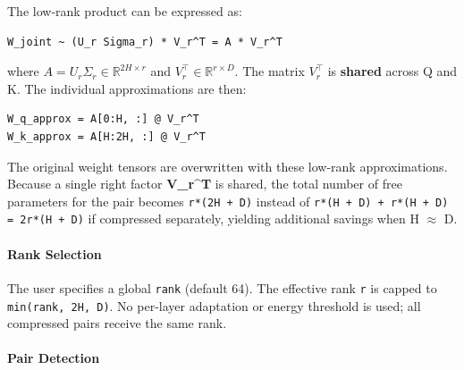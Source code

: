 The low-rank product can be expressed as:

\vspace{0.5em}
\begin{mdframed}[backgroundcolor=codebg, linecolor=codeframe, linewidth=1pt, roundcorner=4pt, innerleftmargin=2pt, innerrightmargin=5pt, innertopmargin=5pt, innerbottommargin=5pt]
\begin{lstlisting}
W_joint ~ (U_r Sigma_r) * V_r^T = A * V_r^T
\end{lstlisting}
\end{mdframed}
\vspace{0.5em}

where $A = U_r \Sigma_r \in \mathbb{R}^{2H \times r}$ and $V_r^\top \in \mathbb{R}^{r \times D}$. The matrix $V_r^\top$ is \textbf{shared} across Q and K. The individual approximations are then:

\vspace{0.5em}
\begin{mdframed}[backgroundcolor=codebg, linecolor=codeframe, linewidth=1pt, roundcorner=4pt, innerleftmargin=2pt, innerrightmargin=5pt, innertopmargin=5pt, innerbottommargin=5pt]
\begin{lstlisting}
W_q_approx = A[0:H, :] @ V_r^T
W_k_approx = A[H:2H, :] @ V_r^T
\end{lstlisting}
\end{mdframed}
\vspace{0.5em}

The original weight tensors are overwritten with these low-rank approximations. Because a single right factor \textbf{V\_r\textasciicircum{}T} is shared, the total number of free parameters for the pair becomes \texttt{r*(2H + D)} instead of \texttt{r*(H + D) + r*(H + D) = 2r*(H + D)} if compressed separately, yielding additional savings when H $\approx$ D.

\paragraph{Rank Selection}

The user specifies a global \texttt{rank} (default 64). The effective rank \texttt{r} is capped to \texttt{min(rank, 2H, D)}. No per-layer adaptation or energy threshold is used; all compressed pairs receive the same rank.

\paragraph{Pair Detection}


